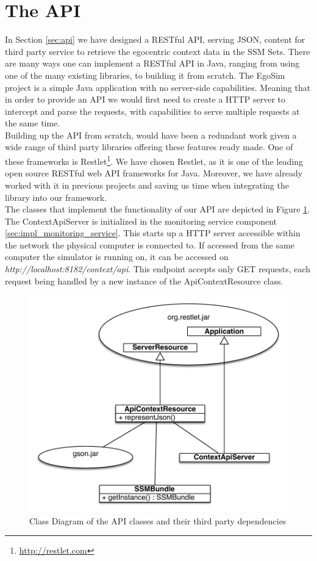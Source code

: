 \section{The API} %
\label{sec:impl_api}
In Section \ref{sec:api} we have designed a RESTful API, serving JSON, content for third party service to retrieve the egocentric context data in the SSM Sets. There are many ways one can implement a RESTful API in Java, ranging from using one of the many existing libraries, to building it from scratch. The EgoSim project is a simple Java application with no server-side capabilities. Meaning that in order to provide an API we would first need to create a HTTP server to intercept and parse the requests, with capabilities to serve multiple requests at the same time.\\

Building up the API from scratch, would have been a redundant work given a wide range of third party libraries offering these features ready made. One of these frameworks is Restlet\footnote{\url{http://restlet.com}}. We have chosen Restlet, as it is one of the leading open source RESTful web API frameworks for Java. Moreover, we have already worked with it in previous projects and saving us time when integrating the library into our framework.\\

The classes that implement the functionality of our API are depicted in Figure \ref{fig:impl_api}. The ContextApiServer is initialized in the monitoring service component \ref{sec:impl_monitoring_service}. This starts up a HTTP server accessible within the network the physical computer is connected to. If accessed from the same computer the simulator is running on, it can be accessed on \emph{http://localhost:8182/context/api}. This endpoint accepts only GET requests, each request being handled by a new instance of the ApiContextResource class.
\begin{figure}[H]
	\centering
	\includegraphics[width=\linewidth]{gfx/Chapter4/api}
	\caption{Class Diagram of the API classes and their third party dependencies}
	\label{fig:impl_api}
\end{figure}

